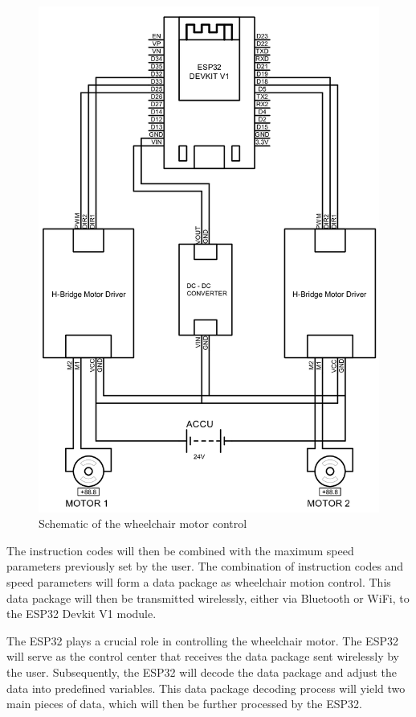 \begin{figure} [!ht] \centering
  \includegraphics[scale=0.24]{gambar/bab3/Schematics.png}
  \caption{Schematic of the wheelchair motor control}
  \label{fig:Skematik Alat}
\end{figure}

The instruction codes will then be combined with the maximum speed parameters previously set by the user. The combination of instruction codes and speed parameters will form a data package as wheelchair motion control. This data package will then be transmitted wirelessly, either via Bluetooth or WiFi, to the ESP32 Devkit V1 module.

The ESP32 plays a crucial role in controlling the wheelchair motor. The ESP32 will serve as the control center that receives the data package sent wirelessly by the user. Subsequently, the ESP32 will decode the data package and adjust the data into predefined variables. This data package decoding process will yield two main pieces of data, which will then be further processed by the ESP32.

